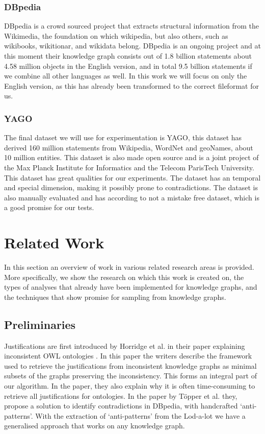 \documentclass{article}
\begin{document}
\subsubsection{DBpedia}
DBpedia\cite{DBpedia} is a crowd sourced project that extracts structural information from the Wikimedia, the foundation on which wikipedia, but also others, such as wikibooks, wikitionar, and wikidata belong. DBpedia is an ongoing project and at this moment their knowledge graph consists out of 1.8 billion statements about 4.58 million objects in the English version, and in total 9.5 billion statements if we combine all other languages as well. In this work we will focus on only the English version, as this has already been transformed to the correct fileformat for us. 

\subsubsection{YAGO}
The final dataset we will use for experimentation is YAGO\cite{YAGO2:2013}, this dataset has derived 160 million statements from Wikipedia, WordNet and geoNames, about 10 million entities. This dataset is also made open source and is a joint project of the Max Planck Institute for Informatics and the Telecom ParisTech University. This dataset has great qualities for our experiments. The dataset has an temporal and special dimension, making it possibly prone to contradictions. The dataset is also manually evaluated and has according to \cite{YAGO2:2013} not a mistake free dataset, which is a good promise for our tests.

\newpage
\section{Related Work}
In this section an overview of work in various related research areas is provided. More specifically, we show the research on which this work is created on, the types of analyses that already have been implemented for knowledge graphs, and the techniques that show promise for sampling from knowledge graphs. \\

\subsection{Preliminaries}
Justifications are first introduced by Horridge et al. in their paper explaining inconsistent OWL ontologies \cite{Horridge:2009}. In this paper the writers describe the framework used to retrieve the justifications from inconsistent knowledge graphs as minimal subsets of the graphs preserving the inconsistency. This forms an integral part of our algorithm. In the paper, they also explain why it is often time-consuming to retrieve all justifications for ontologies. In the paper by T\"{o}pper et al. \cite{Topper:2012} they, propose a solution to identify contradictions in DBpedia, with handcrafted `anti-patterns'. With the extraction of `anti-patterns' from the Lod-a-lot we have a generalised approach that works on any knowledge graph. \\
\end{document}
